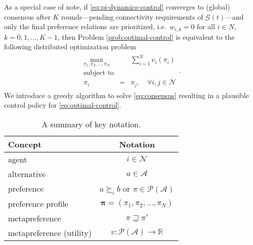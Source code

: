 \documentclass[conference]{ieeeconf}
\newcommand{\R}{\mathbb{R}}
\newcommand{\N}{\mathcal{N}}
\newcommand{\A}{\mathcal{A}}
\renewcommand{\P}{\mathcal{P}}
\newcommand{\prefers}{\succsim}
\newcommand{\metaprefers}{\sqsupseteq}
\newcommand{\join}{\vee}
\newcommand{\meet}{\wedge}
\renewcommand{\leq}{\leqslant}
\renewcommand{\geq}{\geqslant}
\begin{document}
As a special case of note, if \eqref{eq:pi-dynamics-control} converges to (global) consensus after $K$ rounds---pending connectivity requirements of $\mathcal{G}(t)$---and only the final preference relations are prioritized, i.e.~$w_{i,k} = 0$ for all $i \in N$, $k = 0,1,\dots,K-1$, then Problem \ref{prob:optimal-control} is equivalent to the following distributed optimization problem
    \begin{align}
        \begin{aligned}
            \max_{\pi_1,\pi_2,\dots,\pi_N} && \sum_{i=1}^N v_i(\pi_i) \\
            \text{subject to} && \\
            \pi_i &=& \pi_j, \quad \forall i,j \in \N
        \end{aligned} \label{eq:consensus}.
    \end{align} 
\noindent We introduce a greedy algorithm to solve \eqref{eq:consensus} resulting in a plausible control policy for \eqref{eq:optimal-control}.


\begin{table}
\centering
\caption{A summary of key notation.}
\label{table:notation}
\begin{tabular}{p{5cm}c}
\toprule
Concept & Notation \\
\midrule
agent & $i \in \N$ \\
alternative & $a \in \A$ \\
preference & $a \prefers_i b$ or $\pi \in \P(\A)$ \\
preference profile & $\boldsymbol{\pi} = \left(\pi_1,\pi_2,\dots,\pi_N\right)$ \\
metapreference & $\pi \metaprefers \pi'$ \\
metapreference (utility) & $v: \P(\A) \to \R$\\
\bottomrule
\end{tabular}
\end{table}
\end{document}
